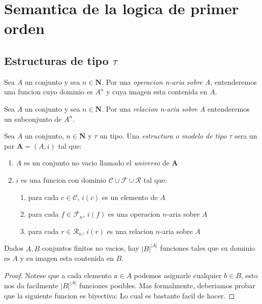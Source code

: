 \section{Semantica de la logica de primer orden}

\subsection{Estructuras de tipo $\tau$}
\begin{definition}
  Sea $A$ un conjunto y sea $n \in \mathbf{N}$. Por una \emph{operacion n-aria sobre A}, entenderemos
  una funcion cuyo dominio es $A^n$ y cuya imagen esta contenida en $A$.
\end{definition}

\begin{definition}
  Sea $A$ un conjunto y sea $n \in \mathbf{N}$. Por una \emph{relacion n-aria sobre A} entenderemos un subconjunto de $A^n$.
\end{definition}

\begin{definition}
  Sea $A$ un conjunto, $n \in \mathbf{N}$ y $\tau$ un tipo. Una \emph{estructura o modelo de tipo $\tau$} sera un par $\mathbf{A} = (A, i)$ tal que:
  \begin{enumerate}
    \item $A$ es un conjunto no vacio llamado el \emph{universo} de $\mathbf{A}$
    \item $i$ es una funcion con dominio $\mathcal{C} \cup \mathcal{F} \cup \mathcal{R}$ tal que: \begin{enumerate}
      \item para cada $c \in \mathcal{C}$, $i(c)$ es un elemento de $A$
      \item para cada $f \in \mathcal{F}_n$, $i(f)$ es una operacion $n$-aria sobre $A$
      \item para cada $r \in \mathcal{R}_n$, $i(r)$ es una relacion $n$-aria sobre $A$
    \end{enumerate}
  \end{enumerate}
\end{definition}

\begin{lemma}
  Dados $A, B$ conjuntos finitos no vacios, hay $|B|^{|A|}$ funciones tales que su dominio es $A$ y 
  su imagen esta contenida en $B$.
\end{lemma}
\begin{proof}
  Notese que a cada elemento $a\in A$ podemos asignarle cualquier $b\in B$, esto nos da facilmente $|B|^{|A|}$ funciones posibles.
  Mas formalmente, deberiamos probar que la siguiente funcion es biyectiva:
  Lo cual es bastante facil de hacer.
\end{proof}

